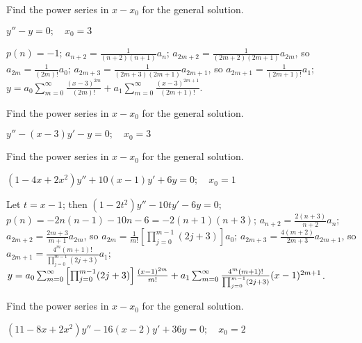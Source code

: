 \documentclass{ximera}
\begin{document}
\begin{problem}\label{exer:7.2.16}
Find the power series in $x-x_0$
for the general solution.

$y''-y=0;\quad   x_0=3$

\begin{solution}
    $p(n)=-1$;
$a_{n+2}=\frac{1}{(n+2)(n+1)}a_n$;
$a_{2m+2}=\frac{1}{(2m+2)(2m+1)}a_{2m}$, so
$a_{2m}=\frac{1}{(2m)!}a_0$;
$a_{2m+3}=\frac{1}{(2m+3)(2m+1)}a_{2m+1}$,
so $a_{2m+1}=\frac{1}{(2m+1)!}a_1$;
$y=a_0\sum_{m=0}^\infty\frac{(x-3)^{2m}}{(2m)!}+a_1\sum_{m=0}^\infty
\frac{(x-3)^{2m+1}}{(2m+1)!}$.
\end{solution}
\end{problem}

\begin{problem}\label{exer:7.2.17}
Find the power series in $x-x_0$
for the general solution.

$y''-(x-3)y'-y=0;\quad   x_0=3$

\end{problem}

\begin{problem}\label{exer:7.2.18} Find the power series in $x-x_0$
for the general solution.

$(1-4x+2x^2)y''+10(x-1)y'+6y=0;\quad  x_0=1$

\begin{solution}
    Let $t=x-1$;  then $(1-2t^2)y''-10ty'-6y=0$;
$p(n)=-2n(n-1)-10n-6=-2(n+1)(n+3)$;
$a_{n+2}=\frac{2(n+3)}{ n+2}a_n$;
$a_{2m+2}=\frac{2m+3}{ m+1}a_{2m}$, so
$a_{2m}=\frac{1}{ m!}\left[\prod_{j=0}^{m-1}(2j+3)\right]a_0$;
$a_{2m+3}=\frac{4(m+2)}{ 2m+3}a_{2m+1}$,
so $a_{2m+1}=\frac{4^m(m+1)!}{\prod_{j=0}^{m-1}(2j+3)}a_1$;
$y=a_0\sum_{m=0}^\infty \left[\prod_{j=0}^{m-1}(2j+3)\right]\frac{
(x-1)^{2m}}{ m!}\\+a_1\sum_{m=0}^\infty
\frac{4^m(m+1)!}{\prod_{j=0}^{m-1}(2j+3)}(x-1)^{2m+1}$.
\end{solution}
\end{problem}

\begin{problem}\label{exer:7.2.19}
Find the power series in $x-x_0$
for the general solution.

$(11-8x+2x^2)y''-16(x-2)y'+36y=0;\quad  x_0=2$
\end{problem}
\end{document}
